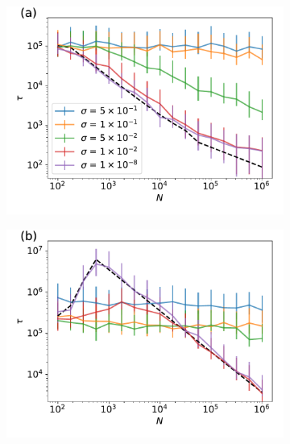 \documentclass[10pt,twocolumn,twoside]{gsajnl}
\begin{document}
\begin{spacing}{1.5}
\begin{figure}[t]
\begin{subfigure}[t]{0.48\textwidth}
\includegraphics[width=\textwidth]{Figures/julia_weissman_5a.pdf}
\end{subfigure}
\begin{subfigure}[b]{0.48\textwidth}
\includegraphics[width=\textwidth]{Figures/julia_weissman_5b.pdf}
\end{subfigure}
\begin{subfigure}[c]{0.48\textwidth}

\end{subfigure}
\end{figure}
\end{spacing}
\end{document}
